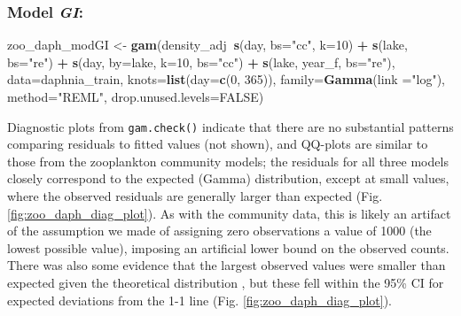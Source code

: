 \documentclass[12pt]{article}
\newenvironment{Shaded}{\begin{snugshade}}{\end{snugshade}}
\newcommand{\KeywordTok}[1]{\textcolor[rgb]{0.13,0.29,0.53}{\textbf{#1}}}
\newcommand{\DataTypeTok}[1]{\textcolor[rgb]{0.13,0.29,0.53}{#1}}
\newcommand{\DecValTok}[1]{\textcolor[rgb]{0.00,0.00,0.81}{#1}}
\newcommand{\StringTok}[1]{\textcolor[rgb]{0.31,0.60,0.02}{#1}}
\newcommand{\OtherTok}[1]{\textcolor[rgb]{0.56,0.35,0.01}{#1}}
\newcommand{\OperatorTok}[1]{\textcolor[rgb]{0.81,0.36,0.00}{\textbf{#1}}}
\newcommand{\NormalTok}[1]{#1}
\begin{document}
\subsubsection{\texorpdfstring{Model
\emph{GI}:}{Model GI:}}\label{model-gi}

\begin{Shaded}
\begin{Highlighting}[]
\NormalTok{zoo_daph_modGI <-}\StringTok{ }\KeywordTok{gam}\NormalTok{(density_adj}\OperatorTok{~}\KeywordTok{s}\NormalTok{(day, }\DataTypeTok{bs=}\StringTok{"cc"}\NormalTok{, }\DataTypeTok{k=}\DecValTok{10}\NormalTok{) }\OperatorTok{+}\StringTok{ }\KeywordTok{s}\NormalTok{(lake, }\DataTypeTok{bs=}\StringTok{"re"}\NormalTok{) }\OperatorTok{+}
\StringTok{                        }\KeywordTok{s}\NormalTok{(day, }\DataTypeTok{by=}\NormalTok{lake, }\DataTypeTok{k=}\DecValTok{10}\NormalTok{, }\DataTypeTok{bs=}\StringTok{"cc"}\NormalTok{) }\OperatorTok{+}
\StringTok{                        }\KeywordTok{s}\NormalTok{(lake, year_f, }\DataTypeTok{bs=}\StringTok{"re"}\NormalTok{),}
                      \DataTypeTok{data=}\NormalTok{daphnia_train, }\DataTypeTok{knots=}\KeywordTok{list}\NormalTok{(}\DataTypeTok{day=}\KeywordTok{c}\NormalTok{(}\DecValTok{0}\NormalTok{, }\DecValTok{365}\NormalTok{)),}
                      \DataTypeTok{family=}\KeywordTok{Gamma}\NormalTok{(}\DataTypeTok{link =}\StringTok{"log"}\NormalTok{), }\DataTypeTok{method=}\StringTok{"REML"}\NormalTok{,}
                      \DataTypeTok{drop.unused.levels=}\OtherTok{FALSE}\NormalTok{)}
\end{Highlighting}
\end{Shaded}

Diagnostic plots from \texttt{gam.check()} indicate that there are no
substantial patterns comparing residuals to fitted values (not shown),
and QQ-plots are similar to those from the zooplankton community models;
the residuals for all three models closely correspond to the expected
(Gamma) distribution, except at small values, where the observed
residuals are generally larger than expected (Fig.
\ref{fig:zoo_daph_diag_plot}). As with the community data, this is
likely an artifact of the assumption we made of assigning zero
observations a value of 1000 (the lowest possible value), imposing an
artificial lower bound on the observed counts. There was also some
evidence that the largest observed values were smaller than expected
given the theoretical distribution , but these fell within the 95\% CI
for expected deviations from the 1-1 line (Fig.
\ref{fig:zoo_daph_diag_plot}).
\end{document}
